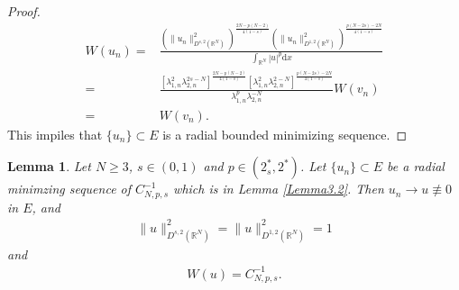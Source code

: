 \documentclass[12pt,a4paper,reqno]{amsart}
\numberwithin{equation}{section}
\newtheorem{lemma}{Lemma}[section]
\begin{document}
\begin{proof}
\begin{equation*}
\begin{aligned}
W(u_{n})
=&
\frac{\left(
\|u_{n}\|_{D^{s,2}(\mathbb{R}^{N})}^{2}
\right)
^{\frac{2N-p(N-2)}{4(1-s)}}
\left(
\|u_{n}\|_{D^{1,2}(\mathbb{R}^{N})}^{2}
\right)
^{\frac{p(N-2s)-2N}{4(1-s)}}}
{\int_{\mathbb{R}^{N}}
|u|^{p}
\mathrm{d}x}\\
=&
\frac{[\lambda_{1,n}^{2}
\lambda_{2,n}^{2s-N}]^{\frac{2N-p(N-2)}{4(1-s)}}[\lambda_{1,n}^{2}
\lambda_{2,n}^{2-N}]^{\frac{p(N-2s)-2N}{4(1-s)}}}{\lambda_{1,n}^{p}
\lambda_{2,n}^{-N}}
W(v_{n})\\
=&W(v_{n}).
\end{aligned}
\end{equation*}
This impiles that $\{u_{n}\}\subset E$ is a radial bounded minimizing sequence.
\end{proof}

\begin{lemma}\label{Lemma3.3}
Let $N\geqslant3$, $s\in(0,1)$ and $p\in (2^{*}_{s},2^{*})$.
Let $\{u_{n}\}\subset E$ be a radial minimzing sequence  of $C_{N,p,s}^{-1}$ which is in Lemma \ref{Lemma3.2}.
Then $u_{n}\to u\not\equiv 0$ in $E$, and
\begin{equation*}
\begin{aligned}
\|u\|_{D^{s,2}(\mathbb{R}^{N})}^{2}
=
\|u\|_{D^{1,2}(\mathbb{R}^{N})}^{2}
=1
\end{aligned}
\end{equation*}
and
\begin{equation*}
\begin{aligned}
W(u)=C_{N,p,s}^{-1}.
\end{aligned}
\end{equation*}
\end{lemma}
\end{document}
